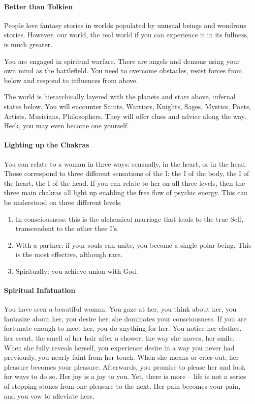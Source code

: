 \paragraph{Better than Tolkien}
People love fantasy stories in worlds populated by unusual beings and wondrous stories. However, our world, the real world if you can experience it in its fullness, is much greater.

You are engaged in spiritual warfare. There are angels and demons using your own mind as the battlefield. You need to overcome obstacles, resist forces from below and respond to influences from above.

The world is hierarchically layered with the planets and stars above, infernal states below. You will encounter Saints, Warriors, Knights, Sages, Mystics, Poets, Artists, Musicians, Philosophers. They will offer clues and advice along the way. Heck, you may even become one yourself.

\paragraph{Lighting up the Chakras}
You can relate to a woman in three ways: sensually, in the heart, or in the head. Those correspond to three different sensations of the I: the I of the body, the I of the heart, the I of the head. If you can relate to her on all three levels, then the three main chakras all light up enabling the free flow of psychic energy. This can be understood on three different levels:

\begin{enumerate}
\item In consciousness: this is the alchemical marriage that leads to the true Self, transcendent to the other thee I's. 
\item With a partner: if your souls can unite, you become a single polar being. This is the most effective, although rare. 
\item Spiritually: you achieve union with God.
\end{enumerate}
\paragraph{Spiritual Infatuation}
You have seen a beautiful woman. You gaze at her, you think about her, you fantasize about her, you desire her; she dominates your consciousness. If you are fortunate enough to meet her, you do anything for her. You notice her clothes, her scent, the smell of her hair after a shower, the way she moves, her smile. When she fully reveals herself, you experience desire in a way you never had previously, you nearly faint from her touch. When she moans or cries out, her pleasure becomes your pleasure. Afterwards, you promise to please her and look for ways to do so. Her joy is a joy to you. Yet, there is more – life is not a series of stepping stones from one pleasure to the next. Her pain becomes your pain, and you vow to alleviate hers.

